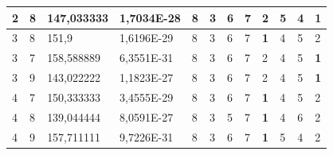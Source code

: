 \documentclass[conference]{IEEEtran}
\begin{document}
\begin{table}[]
\begin{tabular}{|llll|llllllll|}
		\multicolumn{1}{|l|}{2}   & \multicolumn{1}{l|}{8}         & \multicolumn{1}{l|}{147,033333}    & 1,7034E-28 & \multicolumn{1}{l|}{8}   & \multicolumn{1}{l|}{3}   & \multicolumn{1}{l|}{6}   & \multicolumn{1}{l|}{7}   & \multicolumn{1}{l|}{2}          & \multicolumn{1}{l|}{5}   & \multicolumn{1}{l|}{4}   & \textbf{1}             \\ \hline
		\multicolumn{1}{|l|}{3}   & \multicolumn{1}{l|}{8}         & \multicolumn{1}{l|}{151,9}         & 1,6196E-29 & \multicolumn{1}{l|}{8}   & \multicolumn{1}{l|}{3}   & \multicolumn{1}{l|}{6}   & \multicolumn{1}{l|}{7}   & \multicolumn{1}{l|}{\textbf{1}} & \multicolumn{1}{l|}{4}   & \multicolumn{1}{l|}{5}   & 2                      \\ \hline
		\multicolumn{1}{|l|}{3}   & \multicolumn{1}{l|}{7}         & \multicolumn{1}{l|}{158,588889}    & 6,3551E-31 & \multicolumn{1}{l|}{8}   & \multicolumn{1}{l|}{3}   & \multicolumn{1}{l|}{6}   & \multicolumn{1}{l|}{7}   & \multicolumn{1}{l|}{2}          & \multicolumn{1}{l|}{4}   & \multicolumn{1}{l|}{5}   & \textbf{1}             \\ \hline
		\multicolumn{1}{|l|}{3}   & \multicolumn{1}{l|}{9}         & \multicolumn{1}{l|}{143,022222}    & 1,1823E-27 & \multicolumn{1}{l|}{8}   & \multicolumn{1}{l|}{3}   & \multicolumn{1}{l|}{6}   & \multicolumn{1}{l|}{7}   & \multicolumn{1}{l|}{2}          & \multicolumn{1}{l|}{4}   & \multicolumn{1}{l|}{5}   & \textbf{1}             \\ \hline
		\multicolumn{1}{|l|}{4}   & \multicolumn{1}{l|}{7}         & \multicolumn{1}{l|}{150,333333}    & 3,4555E-29 & \multicolumn{1}{l|}{8}   & \multicolumn{1}{l|}{3}   & \multicolumn{1}{l|}{6}   & \multicolumn{1}{l|}{7}   & \multicolumn{1}{l|}{\textbf{1}} & \multicolumn{1}{l|}{4}   & \multicolumn{1}{l|}{5}   & 2                      \\ \hline
		\multicolumn{1}{|l|}{4}   & \multicolumn{1}{l|}{8}         & \multicolumn{1}{l|}{139,044444}    & 8,0591E-27 & \multicolumn{1}{l|}{8}   & \multicolumn{1}{l|}{3}   & \multicolumn{1}{l|}{5}   & \multicolumn{1}{l|}{7}   & \multicolumn{1}{l|}{\textbf{1}} & \multicolumn{1}{l|}{4}   & \multicolumn{1}{l|}{6}   & 2                      \\ \hline
		\multicolumn{1}{|l|}{4}   & \multicolumn{1}{l|}{9}         & \multicolumn{1}{l|}{157,711111}    & 9,7226E-31 & \multicolumn{1}{l|}{8}   & \multicolumn{1}{l|}{3}   & \multicolumn{1}{l|}{6}   & \multicolumn{1}{l|}{7}   & \multicolumn{1}{l|}{\textbf{1}} & \multicolumn{1}{l|}{5}   & \multicolumn{1}{l|}{4}   & 2                      \\ \hline

\end{tabular}
\end{table}
\end{document}
